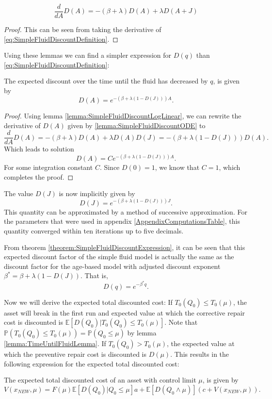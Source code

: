 \begin{lemma}\label{lemma:SimpleFluidDiscountODE}
	$$\frac{d}{dA}D(A)=-(\beta+\lambda)D(A)+\lambda D(A+J)$$
	\begin{proof}
		This can be seen from taking the derivative of \eqref{eq:SimpleFluidDiscountDefinition}.
	\end{proof}
\end{lemma}
Using these lemmas we can find a simpler expression for $D(q)$ than \eqref{eq:SimpleFluidDiscountDefinition}:
\begin{theorem}\label{theorem:SimpleFluidDiscountExpression}
	The expected discount over the time until the fluid has decreased by $q$, is given by
	\[
	D(A)=e^{-(\beta+\lambda(1-D(J)))A}.
	\]
	\begin{proof}
		Using lemma \ref{lemma:SimpleFluidDiscountLogLinear}, we can rewrite the derivative of $D(A)$ given by \ref{lemma:SimpleFluidDiscountODE} to
		\[
		\frac{d}{dA}D(A)=-(\beta+\lambda)D(A)+\lambda D(A)D(J)=-(\beta+\lambda(1-D(J)))D(A).
		\]
		Which leads to solution
		\[
		D(A)=Ce^{-(\beta+\lambda(1-D(J)))A}.
		\]
		For some integration constant $C$. Since $D(0)=1$, we know that $C=1$, which completes the proof.
	\end{proof}
\end{theorem}
\begin{corollary}
	The value $D(J)$ is now implicitly given by
	\[
	D(J)=e^{-(\beta+\lambda(1-D(J)))J}.
	\]
	This quantity can be approximated by a method of successive approximation.
	For the parameters that were used in appendix \ref{AppendixComputationsTable}, this quantity converged within ten iterations up to five decimals.
\end{corollary}
\begin{remark}\label{remark:SimpleFluidDiscountEquivalence}
	From theorem \ref{theorem:SimpleFluidDiscountExpression}, it can be seen that this expected discount factor of the simple fluid model is actually the same as the discount factor for the age-based model with adjusted discount exponent $\beta^*=\beta+\lambda(1-D(J))$.
	That is,
	\[
	D(q)=e^{-\beta^*q}.
	\]
\end{remark}

Now we will derive the expected total discounted cost:
If $T_0(Q_0)\leq T_0(\mu)$, the asset will break in the first run and expected value at which the corrective repair cost is discounted is $\mathbb{E}[D(Q_0)|T_0(Q_0)\leq T_0(\mu)]$.
Note that $\mathbb{P}(T_0(Q_0)\leq T_0(\mu))=\mathbb{P}(Q_0\leq\mu)$ by lemma \ref{lemma:TimeUntilFluidLemma}.
If $T_0(Q_0)> T_0(\mu)$, the expected value at which the preventive repair cost is discounted is $D(\mu)$.
This results in the following expression for the expected total discounted cost:
\begin{theorem}
	The expected total discounted cost of an asset with control limit $\mu$, is given by
	\begin{equation}\label{eq:SimpleFluidImplicitTDC}
	V(x_{NEW},\mu)=F(\mu)\mathbb{E}[D(Q_0)|Q_0\leq \mu]a+\mathbb{E}[D(Q_0\wedge\mu)](c+V(x_{NEW},\mu)).
	\end{equation}
\end{theorem}

